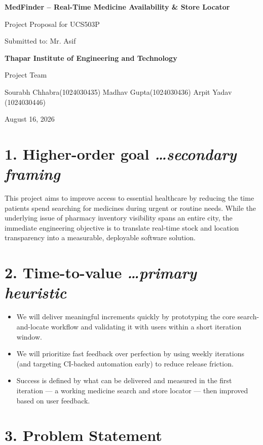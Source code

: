 \documentclass[
]{article}
\author{}
\date{}
\begin{document}
\textbf{MedFinder -- Real-Time Medicine Availability \& Store Locator}

Project Proposal for UCS503P

Submitted to: Mr. Asif

\textbf{Thapar Institute of Engineering and Technology}

Project Team

Sourabh Chhabra(1024030435) \textbar{} Madhav Gupta(1024030436)
\textbar{} Arpit Yadav (1024030446)

August 16, 2026

\section{\texorpdfstring{\textbf{1. Higher-order goal}
\emph{\ldots secondary
framing}}{1. Higher-order goal \ldots secondary framing}}\label{higher-order-goal-secondary-framing}

This project aims to improve access to essential healthcare by reducing
the time patients spend searching for medicines during urgent or routine
needs. While the underlying issue of pharmacy inventory visibility spans
an entire city, the immediate engineering objective is to translate
real-time stock and location transparency into a measurable, deployable
software solution.

\section{\texorpdfstring{\textbf{2. Time-to-value} \emph{\ldots primary
heuristic}}{2. Time-to-value \ldots primary heuristic}}\label{time-to-value-primary-heuristic}

\begin{itemize}
\item
  We will deliver meaningful increments quickly by prototyping the core
  search-and-locate workflow and validating it with users within a short
  iteration window.
\item
  We will prioritize fast feedback over perfection by using weekly
  iterations (and targeting CI-backed automation early) to reduce
  release friction.
\item
  Success is defined by what can be delivered and measured in the first
  iteration --- a working medicine search and store locator --- then
  improved based on user feedback.
\end{itemize}

\section{\texorpdfstring{\textbf{3. Problem
Statement}}{3. Problem Statement}}\label{problem-statement}
\end{document}
